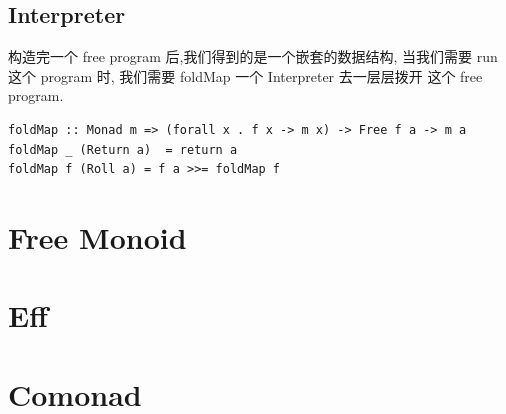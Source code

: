 \documentclass[11pt]{tufte-book}
\begin{document}
\section{Interpreter}
\label{sec:orgf423a52}
构造完一个 free program 后,我们得到的是一个嵌套的数据结构, 当我们需要 run 这个 program 时, 我们需要 foldMap 一个
Interpreter 去一层层拨开 这个 free program.

\begin{verbatim}
foldMap :: Monad m => (forall x . f x -> m x) -> Free f a -> m a
foldMap _ (Return a)  = return a
foldMap f (Roll a) = f a >>= foldMap f
\end{verbatim}

\chapter{Free Monoid}
\label{sec:orgd4188f6}
\chapter{Eff}
\label{sec:org77d9013}

\chapter{Comonad}
\label{sec:org14523aa}
\end{document}
